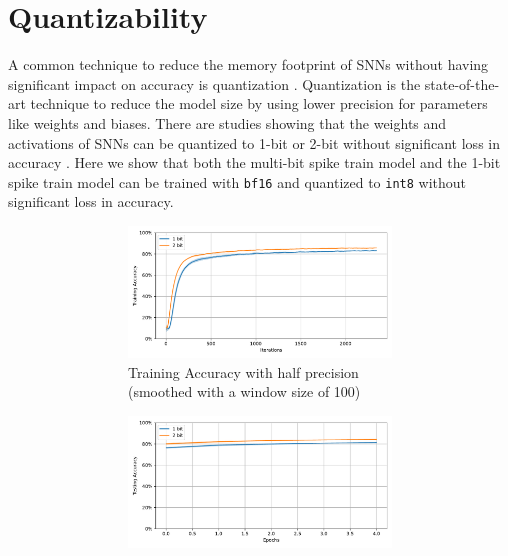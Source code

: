 \section{Quantizability}
\label{sec:quantizability}
    A common technique to reduce the memory footprint of SNNs without having significant impact on accuracy is quantization \cite{9534087}. Quantization is the state-of-the-art technique to reduce the model size by using lower precision for parameters like weights and biases. There are studies showing that the weights and activations of SNNs can be quantized to 1-bit or 2-bit without significant loss in accuracy \cite{10.1145/3664647.3681186}. Here we show that both the multi-bit spike train model and the 1-bit spike train model can be trained with \verb|bf16| and quantized to \verb|int8| without significant loss in accuracy.
    \begin{figure}[!htpb]
        \centering
        \begin{subfigure}[H]{\textwidth}
            \centering
            \begin{subfigure}[H]{\textwidth}
                \centering
                \includegraphics[width=\textwidth]{../quantized/FashionMNIST/plots/fashionmnist_train_acc.pdf}
                \caption{Training Accuracy with half precision (smoothed with a window size of 100)}
            \end{subfigure}
            \hfill
            \begin{subfigure}[H]{\textwidth}
                \centering
                \includegraphics[width=\textwidth]{../bf16/FashionMNIST/plots/fashionmnist_test_acc.pdf}

\end{subfigure}
\end{subfigure}
\end{figure}
